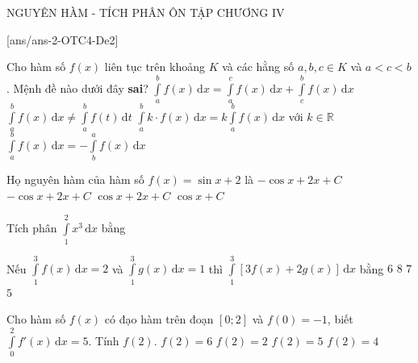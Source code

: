 \begin{name}
	{NGUYÊN HÀM - TÍCH PHÂN}
	{ÔN TẬP CHƯƠNG IV}
	{\tentruong}
	{\thoigian}
\end{name}
\setcounter{ex}{0}\setcounter{bt}{0}
[ans/ans-2-OTC4-De2]
\caulc
\begin{ex}%
	Cho hàm số $ f(x) $ liên tục trên khoảng $ K $ và các hằng số $ a, b, c \in K $ và $a<c<b$. Mệnh đề nào dưới đây \textbf{sai}?
	\choice
	{$ \displaystyle \int \limits^b_a f(x) \mathrm{\,d}x = \displaystyle \int \limits^c_a f(x) \mathrm{\,d}x + \displaystyle \int \limits^b_c f(x) \mathrm{\,d}x $}
	{\True $ \displaystyle \int \limits^b_a f(x) \mathrm{\,d}x \neq \displaystyle \int \limits^b_a f(t) \mathrm{\,d}t $}
	{$ \displaystyle \int \limits^b_a k \cdot f(x) \mathrm{\,d}x = \displaystyle k \int \limits^b_a f(x) \mathrm{\,d}x $ với $ k \in \mathbb{R} $}
	{$ \displaystyle \int \limits^b_a f(x) \mathrm{\,d}x = \displaystyle - \int \limits^a_b f(x) \mathrm{\,d}x $}
\end{ex}
\begin{ex}%
	Họ nguyên hàm của hàm số $f(x)=\sin x+2$ là
	\choice
	{\True $-\cos x+2x+C$}
	{$-\cos x+2x+C$}
	{ $\cos x+2x+C$}
	{ $\cos x+C$}
\end{ex}
\begin{ex}%
	Tích phân $\displaystyle\int\limits_{1}^{2} x^3\mathrm{\,d}x$ bằng
\end{ex}
\begin{ex}%
	Nếu $\displaystyle\int\limits_1^3 f(x)\mathrm{\,d}x=2$ và $\displaystyle\int\limits_1^3 g(x)\mathrm{\,d}x=1$ thì $\displaystyle\int\limits_1^3 [3f(x)+2g(x)]\mathrm{\,d}x$ bằng
	\choice
	{$6$}
	{\True $8$}
	{$7$}
	{$5$}
\end{ex}
\begin{ex}%
	Cho hàm số $f\left(x\right)$ có đạo hàm trên đoạn $\left[0;2\right]$ và $f\left(0\right) = - 1$, biết $\displaystyle\int\limits_{0}^{2} f'\left(x\right)\mathrm{\,d}x = 5$. Tính $f\left(2\right)$.
	\choice
	{$f\left(2\right) = 6$}
	{$f\left(2\right) = 2$}
	{$f\left(2\right) = 5$}
	{\True $f\left(2\right) = 4$}
\end{ex}
